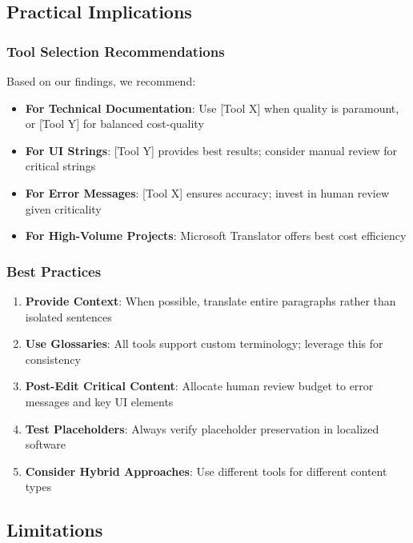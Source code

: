 \subsection{Practical Implications}

\subsubsection{Tool Selection Recommendations}

Based on our findings, we recommend:

\begin{itemize}
    \item \textbf{For Technical Documentation}: Use [Tool X] when quality is paramount, or [Tool Y] for balanced cost-quality
    \item \textbf{For UI Strings}: [Tool Y] provides best results; consider manual review for critical strings
    \item \textbf{For Error Messages}: [Tool X] ensures accuracy; invest in human review given criticality
    \item \textbf{For High-Volume Projects}: Microsoft Translator offers best cost efficiency
\end{itemize}

\subsubsection{Best Practices}

\begin{enumerate}
    \item \textbf{Provide Context}: When possible, translate entire paragraphs rather than isolated sentences
    \item \textbf{Use Glossaries}: All tools support custom terminology; leverage this for consistency
    \item \textbf{Post-Edit Critical Content}: Allocate human review budget to error messages and key UI elements
    \item \textbf{Test Placeholders}: Always verify placeholder preservation in localized software
    \item \textbf{Consider Hybrid Approaches}: Use different tools for different content types
\end{enumerate}

\subsection{Limitations}

